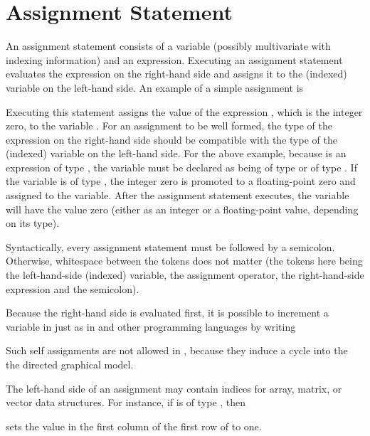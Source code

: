 \section{Assignment Statement}

An assignment statement consists of a variable (possibly multivariate
with indexing information) and an expression.  Executing an
assignment statement evaluates the expression on the right-hand side
and assigns it to the (indexed) variable on the left-hand side.  An
example of a simple assignment is
%
\begin{quote}
\end{quote}
%
Executing this statement assigns the value of the expression ,
which is the integer zero, to the variable .  For an assignment
to be well formed, the type of the expression on the right-hand side
should be compatible with the type of the (indexed) variable on the
left-hand side.  For the above example, because  is an
expression of type , the variable  must be declared
as being of type  or of type .  If the variable
is of type , the integer zero is promoted to a
floating-point zero and assigned to the variable.  After the
assignment statement executes, the variable  will have the
value zero (either as an integer or a floating-point value, depending on
its type).

Syntactically, every assignment statement must be followed by a
semicolon.  Otherwise, whitespace between the tokens does not matter
(the tokens here being the left-hand-side (indexed) variable, the
assignment operator, the right-hand-side expression and the
semicolon).

Because the right-hand side is evaluated first, it is possible to
increment a variable in \Stan just as in \Cpp and other programming
languages by writing
%
\begin{quote}
\end{quote}
%
Such self assignments are not allowed in \BUGS, because they induce a
cycle into the the directed graphical model.

The left-hand side of an assignment may contain indices for array, matrix, or vector
data structures.  For instance, if  is of type
, then 
%
\begin{quote}
\end{quote}
%
sets the value in the first column of the first row of  to one.

